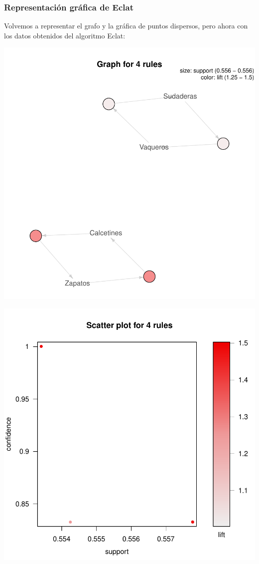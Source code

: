 \documentclass [a4paper] {article}
\begin{document}
\subsubsection{Representación gráfica de Eclat}
Volvemos a representar el grafo y la gráfica de puntos dispersos, pero ahora
con los datos obtenidos del algoritmo Eclat:

\includegraphics{Memoria-Figura 7}

\includegraphics{Memoria-Figura 8}
\end{document}
